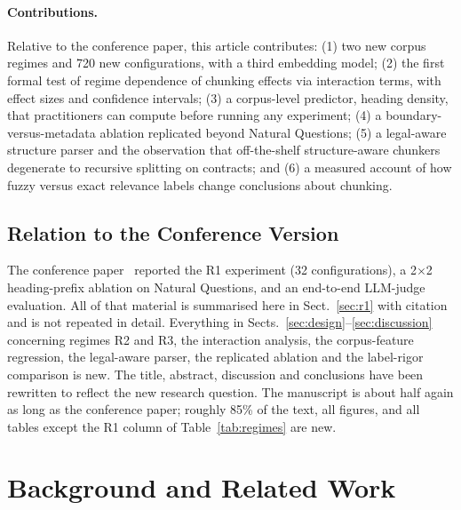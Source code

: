 \documentclass[runningheads]{llncs}
\begin{document}
\paragraph{Contributions.} Relative to the conference paper, this article contributes: (1) two new corpus regimes and 720 new configurations, with a third embedding model; (2) the first formal test of regime dependence of chunking effects via interaction terms, with effect sizes and confidence intervals; (3) a corpus-level predictor, heading density, that practitioners can compute before running any experiment; (4) a boundary-versus-metadata ablation replicated beyond Natural Questions; (5) a legal-aware structure parser and the observation that off-the-shelf structure-aware chunkers degenerate to recursive splitting on contracts; and (6) a measured account of how fuzzy versus exact relevance labels change conclusions about chunking.

\subsection{Relation to the Conference Version}
\label{sec:whatsnew}
The conference paper~\cite{chauhan2026chunking} reported the R1 experiment (32 configurations), a 2$\times$2 heading-prefix ablation on Natural Questions, and an end-to-end LLM-judge evaluation. All of that material is summarised here in Sect.~\ref{sec:r1} with citation and is not repeated in detail. Everything in Sects.~\ref{sec:design}--\ref{sec:discussion} concerning regimes R2 and R3, the interaction analysis, the corpus-feature regression, the legal-aware parser, the replicated ablation and the label-rigor comparison is new. The title, abstract, discussion and conclusions have been rewritten to reflect the new research question. The manuscript is about half again as long as the conference paper; roughly 85\% of the text, all figures, and all tables except the R1 column of Table~\ref{tab:regimes} are new.

\section{Background and Related Work}
\label{sec:related}
\end{document}

